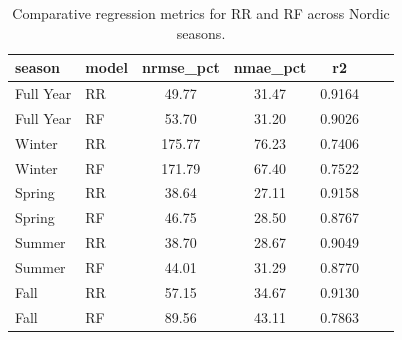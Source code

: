 \begin{table}
\caption{Comparative regression metrics for RR and RF across Nordic seasons.}
\label{tab:metrics_summary}
\begin{tabular}{llccccc}
\toprule
season & model & nrmse_pct & nmae_pct & r2 \\
\midrule
Full Year & RR & 49.77 & 31.47 & 0.9164 \\
Full Year & RF & 53.70 & 31.20 & 0.9026 \\
Winter & RR & 175.77 & 76.23 & 0.7406 \\
Winter & RF & 171.79 & 67.40 & 0.7522 \\
Spring & RR & 38.64 & 27.11 & 0.9158 \\
Spring & RF & 46.75 & 28.50 & 0.8767 \\
Summer & RR & 38.70 & 28.67 & 0.9049 \\
Summer & RF & 44.01 & 31.29 & 0.8770 \\
Fall & RR & 57.15 & 34.67 & 0.9130 \\
Fall & RF & 89.56 & 43.11 & 0.7863 \\
\bottomrule
\end{tabular}
\end{table}
